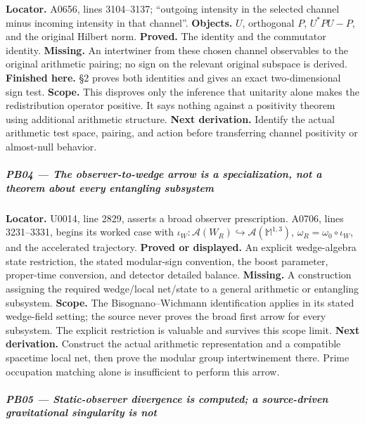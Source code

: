 \textbf{Locator.} A0656, lines 3104--3137; ``outgoing intensity in the
selected channel minus incoming intensity in that channel''.
\textbf{Objects.} \(U\), orthogonal \(P\), \(U^*PU-P\), and the original
Hilbert norm. \textbf{Proved.} The
\protect{} identity and the
commutator identity. \textbf{Missing.} An intertwiner from these chosen
channel observables to the original arithmetic pairing; no sign on the
relevant original subspace is derived. \textbf{Finished here.}
\protect{} §2 proves both identities and gives an
exact two-dimensional sign test. \textbf{Scope.} This disproves only the
inference that unitarity alone makes the redistribution operator
positive. It says nothing against a positivity theorem using additional
arithmetic structure. \textbf{Next derivation.} Identify the actual
arithmetic test space, pairing, and action before transferring channel
positivity or almost-null behavior.

\subparagraph{PB04 --- The observer-to-wedge arrow is a specialization,
not a theorem about every entangling
subsystem}\label{pb04-the-observer-to-wedge-arrow-is-a-specialization-not-a-theorem-about-every-entangling-subsystem}

\textbf{Locator.} U0014, line 2829, asserts a broad observer
prescription. A0706, lines 3231--3331, begins its worked case with
\(\iota_W:\mathcal A(W_R)\hookrightarrow\mathcal A(\mathbb M^{1,3})\),
\(\omega_R=\omega_0\circ\iota_W\), and the accelerated trajectory.
\textbf{Proved or displayed.} An explicit wedge-algebra state
restriction, the stated modular-sign convention, the boost parameter,
proper-time conversion, and detector detailed balance. \textbf{Missing.}
A construction assigning the required wedge/local net/state to a general
arithmetic or entangling subsystem. \textbf{Scope.} The
Bisognano--Wichmann identification applies in its stated wedge-field
setting; the source never proves the broad first arrow for every
subsystem. The explicit restriction is valuable and survives this scope
limit. \textbf{Next derivation.} Construct the actual arithmetic
representation and a compatible spacetime local net, then prove the
modular group intertwinement there. Prime occupation matching alone is
insufficient to perform this arrow.

\subparagraph{PB05 --- Static-observer divergence is computed; a
source-driven gravitational singularity is
not}\label{pb05-static-observer-divergence-is-computed-a-source-driven-gravitational-singularity-is-not}

